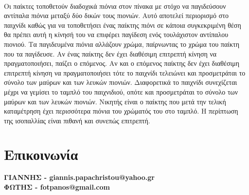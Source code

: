 \documentclass[12pt]{article}
\begin{document}
\\Οι παίκτες τοποθετούν διαδοχικά πιόνια στον πίνακα με στόχο να παγιδεύσουν αντίπαλα πιόνια μεταξύ δύο δικών τους πιονιών. Αυτό αποτελεί περιορισμό στο παιχνίδι καθώς για να τοποθετήσει ένας παίκτης πιόνι σε κάποια συγκεκριμένη θέση θα πρέπει αυτή η κίνησή του να επιφέρει παγίδεση ενός τουλάχιστον αντίπαλου πιονιού. Τα παγιδευμένα πιόνια αλλάζουν χρώμα, παίρνωντας το χρώμα του παίκτη που τα παγίδευσε. Αν ένας παίκτης δεν έχει διαθέσιμη επιτρεπτή κίνηση να πραγματοποιήσει, παίζει ο επόμενος. Αν και ο επόμενος παίκτης δεν έχει διαθέσιμη επιτρεπτή κίνηση να πραγματοποιήσει τότε το παιχνίδι τελειώνει και προσμετράται το σύνολο των μαύρων και των λευκών πιονιών. Διαφορετικά το παιχνίδι συνεχίζεται μέχρι να γεμίσει το ταμπλό του παιχνιδιού, οπότε και προσμετράται το σύνολο των μαύρων και των λευκών πιονιών. Νικητής είναι ο παίκτης που μετά την τελική καταμέτρηση έχει περισσότερα πιόνια του χρώματός του στο ταμπλό. Η περίπτωση της ισοπαλλίας είναι πιθανή και συνεπώς επιτρεπτή. 

\section{Επικοινωνία}


\begin{center}
    \textbf{ΓΙΑΝΝΗΣ - giannis.papachristou@yahoo.gr\\ ΦΩΤΗΣ - fotpanos@gmail.com}
    
\end{center}
\end{document}

